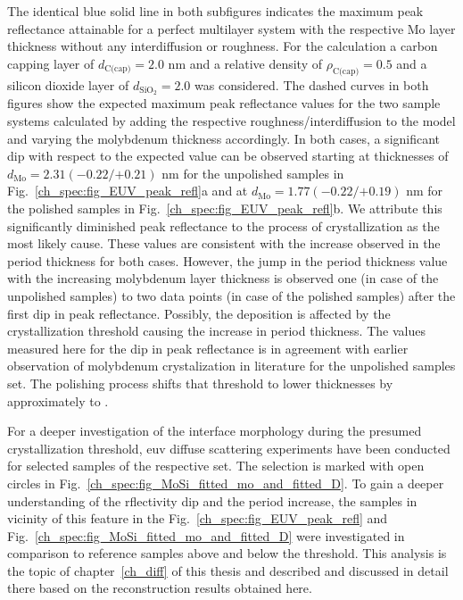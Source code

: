 The identical blue solid line in both subfigures indicates the maximum peak reflectance attainable for a perfect multilayer system with the respective Mo layer thickness without any interdiffusion or roughness. For the calculation a carbon capping layer of $d_\text{C(cap)} = 2.0$ nm and a relative density of $\rho_\text{C(cap)} = 0.5$ and a silicon dioxide layer of $d_\text{SiO$_2$} = 2.0$ was considered. The dashed curves in both figures show the expected maximum peak reflectance values for the two sample systems calculated by adding the respective roughness/interdiffusion to the model and varying the molybdenum thickness accordingly. In both cases, a significant dip with respect to the expected value can be observed starting at thicknesses of $d_\text{Mo} = 2.31({-0.22}/{+0.21})$ nm for the unpolished samples in Fig.~\ref{ch_spec:fig_EUV_peak_refl}a and at $d_\text{Mo} = 1.77({-0.22}/{+0.19})$ nm for the polished samples in Fig.~\ref{ch_spec:fig_EUV_peak_refl}b. We attribute this significantly diminished peak reflectance to the process of crystallization as the most likely cause. These values are consistent with the increase observed in the period thickness for both cases. However, the jump in the period thickness value with the increasing molybdenum layer thickness is observed one (in case of the unpolished samples) to two data points (in case of the polished samples) after the first dip in peak reflectance. Possibly, the deposition is affected by the crystallization threshold causing the increase in period thickness. The values measured here for the dip in peak reflectance is in agreement with earlier observation of molybdenum crystalization in literature \cite{bajt_investigation_2001} for the unpolished samples set. The polishing process shifts that threshold to lower thicknesses by approximately  to .

For a deeper investigation of the interface morphology during the presumed crystallization threshold, \gls{euv} diffuse scattering experiments have been conducted for selected samples of the respective set. The selection is marked with open circles in Fig.~\ref{ch_spec:fig_MoSi_fitted_mo_and_fitted_D}. To gain a deeper understanding of the rflectivity dip and the period increase, the samples in vicinity of this feature in the Fig.~\ref{ch_spec:fig_EUV_peak_refl} and Fig.~\ref{ch_spec:fig_MoSi_fitted_mo_and_fitted_D} were investigated in comparison to reference samples above and below the threshold. This analysis is the topic of chapter~\ref{ch_diff} of this thesis and described and discussed in detail there based on the reconstruction results obtained here.

